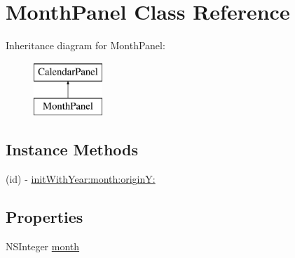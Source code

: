 \hypertarget{interface_month_panel}{\section{Month\+Panel Class Reference}
\label{interface_month_panel}
}
Inheritance diagram for Month\+Panel\+:\begin{figure}[H]
\begin{center}
\leavevmode
\includegraphics[height=2.000000cm]{interface_month_panel}
\end{center}
\end{figure}
\subsection*{Instance Methods}
\begin{DoxyCompactItemize}
\item 
(id) -\/ \hyperlink{interface_month_panel_a81281be5f309c549595979d15ea23f1a}{init\+With\+Year\+:month\+:origin\+Y\+:}
\end{DoxyCompactItemize}
\subsection*{Properties}
\begin{DoxyCompactItemize}
\item 
N\+S\+Integer \hyperlink{interface_month_panel_af3fa55f0361f4a149e3a1267546e37d5}{month}
\end{DoxyCompactItemize}


